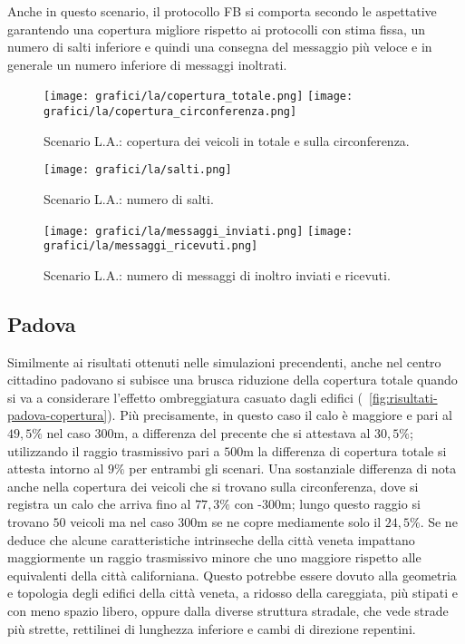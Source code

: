 Anche in questo scenario, il protocollo FB si comporta secondo le aspettative
garantendo una copertura migliore %
rispetto ai protocolli con stima fissa,
un numero di salti inferiore e quindi una consegna del messaggio più veloce
e in generale un numero inferiore di messaggi inoltrati.
%
\begin{figure}[htbp]
	\centering
		\texttt{[image: grafici/la/copertura\_totale.png]}
		\texttt{[image: grafici/la/copertura\_circonferenza.png]}
\caption{Scenario L.A.: copertura dei veicoli in totale e sulla circonferenza.\label{fig:risultati-la-copertura}}
\end{figure}
%
\begin{figure}[htbp]
	\centering
		\texttt{[image: grafici/la/salti.png]}
\caption{Scenario L.A.: numero di salti.\label{fig:risultati-la-salti}}
\end{figure}
%
\begin{figure}[htbp]
	\centering
		\texttt{[image: grafici/la/messaggi\_inviati.png]}
		\texttt{[image: grafici/la/messaggi\_ricevuti.png]}
\caption{Scenario L.A.: numero di messaggi di inoltro inviati e ricevuti.\label{fig:risultati-la-messaggi}}
\end{figure}
\clearpage
%
%
\subsection{Padova}\label{subsec:risultati-pd}
Similmente ai risultati ottenuti nelle simulazioni precendenti,
anche nel centro cittadino padovano si subisce una brusca riduzione della copertura totale
quando si va a considerare l'effetto ombreggiatura casuato dagli edifici (\figurename~\ref{fig:risultati-padova-copertura}).
Più precisamente, in questo caso il calo è maggiore e pari al $49,5\%$ nel caso $300$m,
a differenza del precente che si attestava al $30,5\%$;
utilizzando il raggio trasmissivo pari a $500$m la differenza di copertura totale si attesta
intorno al $9\%$ per entrambi gli scenari.
Una sostanziale differenza di nota anche nella copertura dei veicoli che si trovano sulla circonferenza,
dove si registra un calo che arriva fino al $77,3\%$ con \statica{}-$300$m;
lungo questo raggio si trovano $50$ veicoli ma nel caso $300$m se ne copre mediamente solo il $24,5\%$.
Se ne deduce che alcune caratteristiche intrinseche della città veneta
impattano maggiormente un raggio trasmissivo minore che uno maggiore rispetto
alle equivalenti della città californiana. %
Questo potrebbe essere dovuto alla geometria e topologia degli edifici della città
veneta, a ridosso della careggiata, più stipati e con meno spazio libero,
oppure dalla diverse struttura stradale, che vede strade più strette,
rettilinei di lunghezza inferiore e cambi di direzione repentini.

